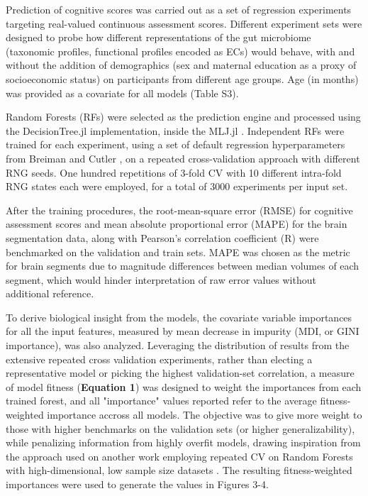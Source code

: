 \documentclass{article}
\begin{document}
Prediction of cognitive scores was carried out as a set of regression
experiments targeting real-valued continuous assessment scores.
Different experiment sets were designed to probe how different
representations of the gut microbiome (taxonomic profiles, functional
profiles encoded as ECs) would behave, with and without the addition of
demographics (sex and maternal education as a proxy of socioeconomic
status) on participants from different age groups. Age (in months) was
provided as a covariate for all models (Table S3).

Random Forests (RFs)
\cite{breimanRandomForests2001}
were selected as the prediction engine and processed using the
DecisionTree.jl \cite{sadeghiDecisionTreeJlJulia2022}
implementation, inside the MLJ.jl \cite{blaomMLJJuliaPackage2020}.
Independent RFs were trained for each
experiment, using a set of default regression hyperparameters from
Breiman and Cutler \cite{breimanRandomForests2001},
on a repeated cross-validation approach with different RNG seeds. One hundred
repetitions of 3-fold CV with 10 different intra-fold RNG states each
were employed, for a total of 3000 experiments per input set.

After the training procedures, the root-mean-square error (RMSE) for
cognitive assessment scores and mean absolute proportional error (MAPE)
for the brain segmentation data, along with Pearson's
correlation coefficient (R) were benchmarked on the validation and train
sets. MAPE was chosen as the metric for brain segments due to magnitude
differences between median volumes of each segment, which would hinder
interpretation of raw error values without additional reference.

To derive biological insight from the models, the covariate variable
importances for all the input features, measured by mean decrease in
impurity (MDI, or GINI importance), was also analyzed. Leveraging the
distribution of results from the extensive repeated cross validation
experiments, rather than electing a representative model or picking the
highest validation-set correlation, a measure of model fitness
(\textbf{Equation 1}) was designed to weight the importances from each
trained forest, and all "importance" values reported refer to 
the average fitness-weighted importance accross all models.
The objective was to give more weight to those with
higher benchmarks on the validation sets (or higher generalizability),
while penalizing information from highly overfit models, drawing
inspiration from the approach used on another work employing repeated CV
on Random Forests with high-dimensional, low sample size
datasets \cite{woodruffInflammationAutoreactivityDefine2022}.
The resulting fitness-weighted importances were used
to generate the values in Figures 3-4.
\end{document}
